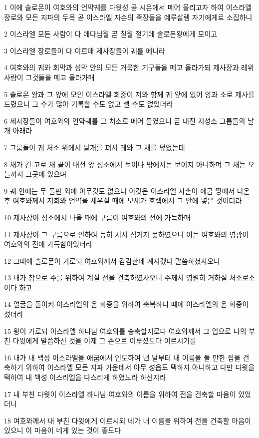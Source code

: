 \par 1 이에 솔로몬이 여호와의 언약궤를 다윗성 곧 시온에서 메어 올리고자 하여 이스라엘 장로와 모든 지파의 두목 곧 이스라엘 자손의 족장들을 예루살렘 자기에게로 소집하니
\par 2 이스라엘 모든 사람이 다 에다님월 곧 칠월 절기에 솔로몬왕에게 모이고
\par 3 이스라엘 장로들이 다 이르매 제사장들이 궤를 메니라
\par 4 여호와의 궤와 회막과 성막 안의 모든 거룩한 기구들을 메고 올라가되 제사장과 레위 사람이 그것들을 메고 올라가매
\par 5 솔로몬 왕과 그 앞에 모인 이스라엘 회중이 저와 함께 궤 앞에 있어 양과 소로 제사를 드렸으니 그 수가 많아 기록할 수도 없고 셀 수도 없었더라
\par 6 제사장들이 여호와의 언약궤를 그 처소로 메어 들였으니 곧 내전 지성소 그룹들의 날개 아래라
\par 7 그룹들이 궤 처소 위에서 날개를 펴서 궤와 그 채를 덮었는데
\par 8 채가 긴 고로 채 끝이 내전 앞 성소에서 보이나 밖에서는 보이지 아니하며 그 채는 오늘까지 그곳에 있으며
\par 9 궤 안에는 두 돌판 외에 아무것도 없으니 이것은 이스라엘 자손이 애굽 땅에서 나온 후 여호와께서 저희와 언약을 세우실 때에 모세가 호렙에서 그 안에 넣은 것이더라
\par 10 제사장이 성소에서 나올 때에 구름이 여호와의 전에 가득하매
\par 11 제사장이 그 구름으로 인하여 능히 서서 섬기지 못하였으니 이는 여호와의 영광이 여호와의 전에 가득함이었더라
\par 12 그때에 솔로몬이 가로되 여호와께서 캄캄한데 계시겠다 말씀하셨사오나
\par 13 내가 참으로 주를 위하여 계실 전을 건축하였사오니 주께서 영원히 거하실 처소로소이다 하고
\par 14 얼굴을 돌이켜 이스라엘의 온 회중을 위하여 축복하니 때에 이스라엘의 온 회중이 섰더라
\par 15 왕이 가로되 이스라엘 하나님 여호와를 송축할지로다 여호와께서 그 입으로 나의 부친 다윗에게 말씀하신 것을 이제 그 손으로 이루셨도다 이르시기를
\par 16 내가 내 백성 이스라엘을 애굽에서 인도하여 낸 날부터 내 이름을 둘 만한 집을 건축하기 위하여 이스라엘 모든 지파 가운데서 아무 성읍도 택하지 아니하고 다만 다윗을 택하여 내 백성 이스라엘을 다스리게 하였노라 하신지라
\par 17 내 부친 다윗이 이스라엘 하나님 여호와의 이름을 위하여 전을 건축할 마음이 있었더니
\par 18 여호와께서 내 부친 다윗에게 이르시되 네가 내 이름을 위하여 전을 건축할 마음이 있으니 이 마음이 네게 있는 것이 좋도다
